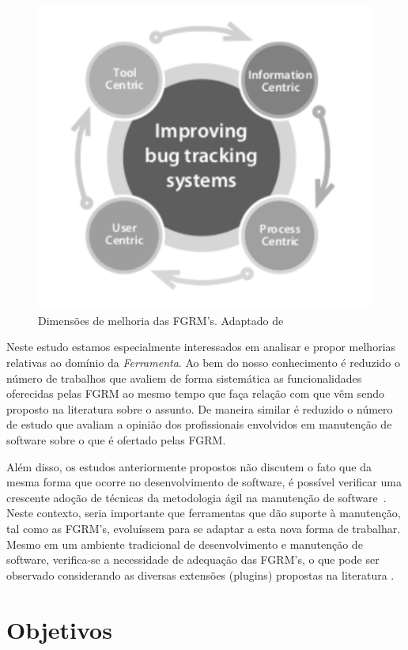 \begin{figure}[htpb] \centering
	\includegraphics[width=0.666666\linewidth]
	{chapter-intro/img/dimensoes_melhorias_fgrm.pdf}
	\caption{Dimensões de melhoria das FGRM's. Adaptado
		de~\cite{zimmermann2005mining}}\label{fig:dimensoes_melhorias_fgrm}
\end{figure}

Neste estudo estamos especialmente interessados em analisar e propor melhorias
relativas ao domínio da \textit{Ferramenta}. Ao bem do nosso conhecimento é
reduzido o número de trabalhos que avaliem de forma sistemática as
funcionalidades oferecidas pelas FGRM ao mesmo tempo que faça relação com que
vêm sendo proposto na literatura sobre o assunto. De maneira similar é reduzido
o número de estudo que avaliam a opinião dos profissionais envolvidos em
manutenção de software sobre o que é ofertado pelas FGRM\@.

Além disso, os estudos anteriormente propostos não discutem o fato que da mesma
forma que ocorre no desenvolvimento de software, é possível verificar uma
crescente adoção de técnicas da metodologia ágil na manutenção de
software~\cite{Soltan2016,Devulapally2015, Heeager2015}. Neste contexto, seria
importante que ferramentas que dão suporte à manutenção, tal como as FGRM's,
evoluíssem para se adaptar a esta nova forma de trabalhar. Mesmo em um
ambiente tradicional de  desenvolvimento e manutenção de software, verifica-se a
necessidade de adequação das FGRM's, o que pode ser observado considerando as
diversas extensões (plugins) propostas na literatura
\cite{101186,Thung:2014:BIT:2635868.2661678,Kononenko:2014:DED:2591062.2591075}.

\section{Objetivos}
\label{sec:intro-objetivos}

